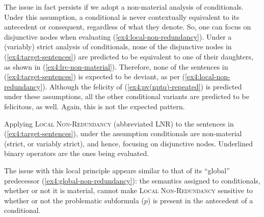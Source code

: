 The issue in fact persists if we adopt a non-material analysis of conditionals. Under this assumption, a conditional is never contextually equivalent to its antecedent or consequent, regardless of what they denote. So, one can focus on disjunctive nodes when evaluating (\ref{ex4:local-non-redundancy}). Under a (variably) strict analysis of conditionals, none of the disjunctive nodes in (\ref{ex4:target-sentences}) are predicted to be equivalent to one of their daughters, as shown in (\ref{ex4:lrc-non-material}). Therefore, none of the sentences in (\ref{ex4:target-sentences}) is expected to be deviant, as per (\ref{ex4:local-non-redundancy}). Although the felicity of  (\ref{ex4:pv(nptq)-repeated}) is predicted under these assumptions, all the other conditional variants are predicted to be felicitous, as well. Again, this is not the expected pattern.

\begin{exe}
	\ex Applying \textsc{Local Non-Redundancy} (abbreviated LNR) to the sentences in (\ref{ex4:target-sentences}), under the assumption conditionals are non-material (strict, or variably strict), and hence, focusing on disjunctive nodes. Underlined binary operators are the ones being evaluated.\label{ex4:lrc-non-material}
	\begin{xlist}
		\label{ex4:pv(pvq)-lnr-non-material}
		\label{ex4:npt(pvq)-lnr-non-material}
		\label{ex4:pv(nptq)-lnr-non-material}
		\label{ex4:pv(nqtp)-lnr-non-material}
		\label{ex4:n(pvq)tp-lnr-non-material}
	\end{xlist}
\end{exe}

The issue with this local principle appears similar to that of its ``global'' predecessor (\ref{ex4:global-non-redundancy}): the semantics assigned to conditionals, whether or not it is material, cannot make \textsc{Local Non-Redundancy} sensitive to whether or not the problematic subformula ($p$) is present in the antecedent of a conditional.






